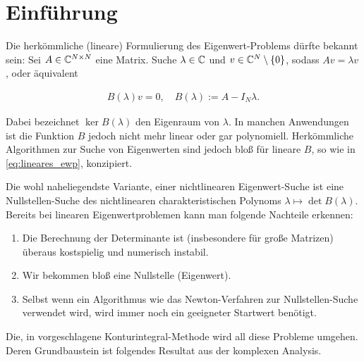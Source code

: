 \section{Einführung}

Die herkömmliche (lineare) Formulierung des Eigenwert-Problems dürfte bekannt sein:
Sei $A \in \mathbb{C}^{N \times N}$ eine Matrix.
Suche $\lambda \in \mathbb{C}$ und $v \in \mathbb{C}^N \setminus {\left \{ 0 \right \}}$, sodass $A v = \lambda v$, oder
äquivalent

\begin{align} \label{eq:lineares_ewp}
    B(\lambda) v = 0,
    \quad
    B(\lambda) := A - I_N \lambda.
\end{align}

Dabei bezeichnet $\ker B(\lambda)$ den Eigenraum von $\lambda$.
In manchen Anwendungen ist die Funktion $B$ jedoch nicht mehr linear oder gar polynomiell.
Herkömmliche Algorithmen zur Suche von Eigenwerten sind jedoch bloß für lineare $B$, so wie in \eqref{eq:lineares_ewp}, konzipiert.

Die wohl naheliegendste Variante, einer nichtlinearen Eigenwert-Suche ist eine Nullstellen-Suche
des nichtlinearen charakteristischen Polynoms $\lambda \mapsto \det B(\lambda)$.
Bereits bei linearen Eigenwertproblemen kann man folgende Nachteile erkennen:

\begin{enumerate}[label = \arabic*.]
    \item Die Berechnung der Determinante ist (insbesondere für große Matrizen) überaus kostspielig
    und numerisch instabil.
    \item Wir bekommen bloß eine Nullstelle (Eigenwert).
    \item Selbst wenn ein Algorithmus wie das Newton-Verfahren zur Nullstellen-Suche verwendet wird, wird immer noch ein geeigneter Startwert benötigt.
\end{enumerate}

Die, in \cite{BEYN20123839} vorgeschlagene Konturintegral-Methode wird all diese Probleme umgehen.
Deren Grundbaustein ist folgendes Resultat aus der komplexen Analysis.
